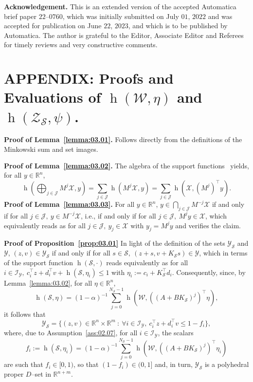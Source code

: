 \documentclass[twocolumn]{autart}
\newcommand{\mb}[1]{\mathbb{#1}}
\newcommand{\mc}[1]{\mathcal{#1}}
\newcommand{\R}{\mb{R}}
\newcommand{\support}[2]{\operatorname{h}(#1,#2)}
\newcommand{\supportbb}[1]{\operatorname{h}(#1,\cdot)}
\numberwithin{equation}{section}
\begin{document}
\textbf{Acknowledgement.} This is an extended version of the accepted Automatica brief paper $22$--$0760$, which was initially submitted on July $01$, $2022$ and was accepted for publication on June $22$, $2023$, and which is to be published by Automatica. The author is grateful to the Editor, Associate Editor and Referees for timely reviews and very constructive comments.

\section*{APPENDIX: Proofs and Evaluations of $\support{\mc{W}}{\eta}$ and $\support{\mc{Z}_\mc{S}}{\psi}$.}

\textbf{Proof of Lemma~\ref{lemma:03.01}.} Follows directly from the definitions of the Minkowski sum and set images.

\textbf{Proof of Lemma~\ref{lemma:03.02}.} The algebra of the support functions~\cite{rockafellar:1970,schneider:1993} yields, for all $y\in\R^n$,
\begin{equation*}
\support{\bigoplus_{j\in\mc{J}} M^j\mc{X}}{y}=\sum_{j\in\mc{J}}\support{M^j\mc{X}}{y}=\sum_{j\in\mc{J}}\support{\mc{X}}{(M^j)^\top y}.
\end{equation*}
\textbf{Proof of Lemma~\ref{lemma:03.03}.} For all $y\in\R^n$,  
$y\in \bigcap_{j\in\mc{J}} M^{-j}\mc{X}$ if and only if for all $j\in\mc{J},\  y\in M^{-j}\mc{X}$, i.e., if and only if for all $j\in\mc{J},\  M^jy\in \mc{X}$, which equivalently reads as  for all $j\in\mc{J},\  y_j\in \mc{X}\text{ with }y_j=M^jy$ and verifies the claim.

\textbf{Proof of Proposition~\ref{prop:03.01}}
In light of the definition of the sets $\mc{Y}_\mc{S}$ and $\mc{Y}$, $(z,v)\in\mc{Y}_\mc{S}$ if and only if for all $s\in \mc{S},\ (z+s,v+K_\mc{S}s)\in \mc{Y}$, which in terms of the support function $\supportbb{\mc{S}}$ reads equivalently as for all $i\in\mc{I}_\mc{Y},\ c_i^\top z+ d_i^\top v +\support{\mc{S}}{\eta_i}\le 1$ with $\eta_i:=c_i+K_\mc{S}^\top d_i$. Consequently, since, by Lemma~\ref{lemma:03.02}, for all $\eta \in\R^n$, 
\begin{equation*}
\support{\mc{S}}{\eta}=(1-\alpha)^{-1}\sum_{j=0}^{N_\mc{S}-1}\support{\mc{W}}{((A+BK_\mc{S})^j)^\top \eta},
\end{equation*}
it follows that
\begin{equation*}
\mc{Y}_\mc{S}=\{(z,v)\in \R^n\times \R^m\ :\ \forall i\in\mc{I}_\mc{Y},\  c_i^\top z + d_i^\top v \le 1-f_i\},
\end{equation*}
where, due to Assumption~\ref{ass:02.07}, for all $i\in\mc{I}_\mc{Y}$, the scalars
\begin{equation*}
f_i:=\support{\mc{S}}{\eta_i}=(1-\alpha)^{-1}\sum_{j=0}^{N_\mc{S}-1}\support{\mc{W}}{((A+BK_\mc{S})^j)^\top \eta_i}
\end{equation*}
are such that $f_i\in [0,1)$, so that $(1-f_i)\in (0,1]$ and, in turn, $\mc{Y}_\mc{S}$ is a polyhedral proper $D$--set in $\R^{n+m}$. 
\end{document}
